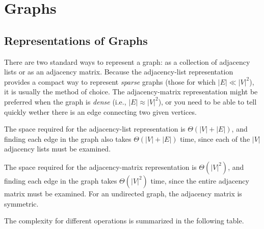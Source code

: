 





\section{Graphs}\label{sec:graphs}
\subsection{Representations of Graphs}
There are two standard ways to represent a graph: as a collection of adjacency lists or as an adjacency matrix.
Because the adjacency-list representation provides a compact way to represent \emph{sparse} graphs (those for which \(|E| \ll |V|^2\)), it is usually the method of choice.
The adjacency-matrix representation might be preferred when the graph is \emph{dense} (i.e., \(|E| \approx |V|^2\)), or you need to be able to tell quickly wether there is an edge connecting two given vertices.

The space required for the adjacency-list representation is \(\Theta(|V| + |E|)\), and finding each edge in the graph also takes \(\Theta(|V| + |E|)\) time, since each of the \(|V|\) adjacency lists must be examined.

The space required for the adjacency-matrix representation is \(\Theta(|V|^2)\), and finding each edge in the graph takes \(\Theta(|V|^2)\) time, since the entire adjacency matrix must be examined.
For an undirected graph, the adjacency matrix is symmetric.%

The complexity for different operations is summarized in the following table.






